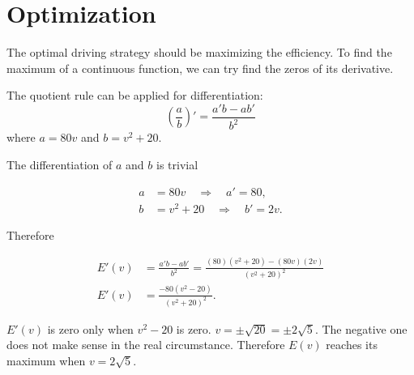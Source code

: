 \documentclass[12pt]{article}
\begin{document}
\section{Optimization}

The optimal driving strategy should be maximizing the efficiency. To find the maximum of a continuous function, we can try find the zeros of its derivative.

The quotient rule can be applied for differentiation:
\begin{equation*}
\left( \frac{a}{b} \right)' = \frac{a'b - ab'}{b^2}
\end{equation*}
where $ a = 80v $ and $ b = v^2 + 20 $.

The differentiation of $a$ and $b$ is trivial

\begin{equation*}
\begin{aligned}
a &= 80v \quad \Rightarrow \quad a' = 80, \\
b &= v^2 + 20 \quad \Rightarrow \quad b' = 2v.
\end{aligned}
\end{equation*}

Therefore

\begin{equation*}
\begin{aligned}
    E'(v) &= \frac{a'b - ab'}{b^2} = \frac{(80)(v^2 + 20) - (80v)(2v)}{(v^2 + 20)^2} \\
    E'(v) &= \boxed{\frac{-80(v^2 - 20)}{(v^2 + 20)^2}}.
\end{aligned}
\end{equation*}

$E'(v)$ is zero only when $v^2 - 20$ is zero. $v = \pm\sqrt{20} = \pm{2\sqrt{5}}$. The negative one does not make sense in the real circumstance. Therefore $E(v)$ reaches its maximum when $v = 2\sqrt{5}$.
\end{document}
